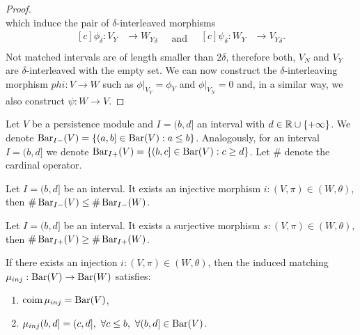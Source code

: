 \begin{proof}
\begin{equation*}
    \end{equation*}
    which induce the pair of $\delta$-interleaved morphisms
    \begin{equation*}
        \begin{aligned}[c]
        \phi_\delta: V_Y &\to {W_Y}_\delta\\
        \end{aligned}
        \quad \text{and} \quad
        \begin{aligned}[c]
        \psi_\delta: W_Y &\to {V_Y}_\delta.\\
        \end{aligned}
    \end{equation*}
    Not matched intervals are of length smaller than $ 2 \delta $, therefore both, $V_N$ and $V_Y$ are $\delta$-interleaved with the empty set. We can now construct the $\delta$-interleaving morphism $ phi: V \to W$ such as $\phi \vert_{V_Y} = \phi_Y$ and $\phi \vert_{V_N} = 0$ and, in a similar way, we also construct $ \psi: W \to V$.
\end{proof}

Let $V$ be a persistence module and $ I = (b, d]$ an interval with $ d \in \mathbb R \cup \{+ \infty\}$. We denote $ \operatorname{Bar}_{I-}(V) = \left\{ (a, b] \in \operatorname{Bar}(V) : a \leq b\right\}$. Analogously, for an interval $ I = (b, d] $ we denote $ \operatorname{Bar}_{I+}(V) = \left\{ (b, c] \in \operatorname{Bar}(V) : c \geq d\right\}$. Let $ \# $ denote the cardinal operator. 
\begin{lemma}
    Let $ I = (b, d] $ be an interval. It exists an injective morphism $i: (V, \pi) \in (W, \theta) $, then $\# \operatorname{Bar}_{I-}(V) \leq \# \operatorname{Bar}_{I-}(W) $.
\end{lemma}

\begin{lemma}
    Let $ I = (b, d] $ be an interval. It exists a surjective morphism $s: (V, \pi) \in (W, \theta) $, then $\# \operatorname{Bar}_{I+}(V) \geq \# \operatorname{Bar}_{I+}(W) $.
\end{lemma}

\begin{lemma}
    If there exists an injection $i: (V, \pi) \in (W, \theta) $, then the induced matching $ \mu_{inj}: \operatorname{Bar}(V) \to \operatorname{Bar} (W) $ satisfies:
    \begin{enumerate}
        \item $\operatorname{coim} \mu_{inj} = \operatorname{Bar}(V)$,
        \item $\mu_{inj}(b, d] = (c, d], \ \forall c \leq b, \ \forall (b, d] \in \operatorname{Bar}(V)$.
    \end{enumerate}
\end{lemma}

